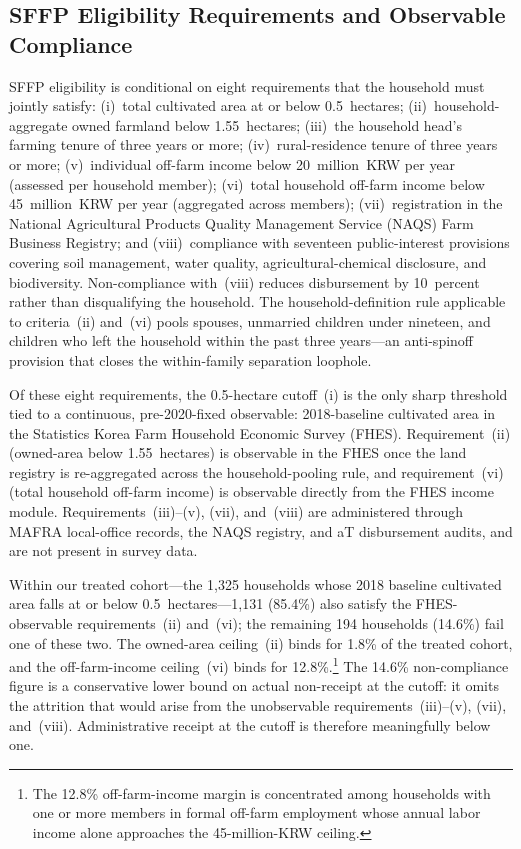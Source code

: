 \documentclass[12pt, a4paper]{article}
\begin{document}
\subsection{SFFP Eligibility Requirements and Observable Compliance}
\label{sec:institutional-eligibility}

SFFP eligibility is conditional on eight requirements that the household must jointly satisfy: (i)~total cultivated area at or below 0.5~hectares; (ii)~household-aggregate owned farmland below 1.55~hectares; (iii)~the household head's farming tenure of three years or more; (iv)~rural-residence tenure of three years or more; (v)~individual off-farm income below 20~million~KRW per year (assessed per household member); (vi)~total household off-farm income below 45~million~KRW per year (aggregated across members); (vii)~registration in the National Agricultural Products Quality Management Service (NAQS) Farm Business Registry; and (viii)~compliance with seventeen public-interest provisions covering soil management, water quality, agricultural-chemical disclosure, and biodiversity. Non-compliance with~(viii) reduces disbursement by 10~percent rather than disqualifying the household. The household-definition rule applicable to criteria~(ii) and~(vi) pools spouses, unmarried children under nineteen, and children who left the household within the past three years---an anti-spinoff provision that closes the within-family separation loophole.

Of these eight requirements, the 0.5-hectare cutoff~(i) is the only sharp threshold tied to a continuous, pre-2020-fixed observable: 2018-baseline cultivated area in the Statistics Korea Farm Household Economic Survey (FHES). Requirement~(ii) (owned-area below 1.55~hectares) is observable in the FHES once the land registry is re-aggregated across the household-pooling rule, and requirement~(vi) (total household off-farm income) is observable directly from the FHES income module. Requirements~(iii)--(v), (vii), and~(viii) are administered through MAFRA local-office records, the NAQS registry, and aT disbursement audits, and are not present in survey data.

Within our treated cohort---the 1{,}325 households whose 2018 baseline cultivated area falls at or below 0.5~hectares---1{,}131 (85.4\%) also satisfy the FHES-observable requirements~(ii) and~(vi); the remaining 194 households (14.6\%) fail one of these two. The owned-area ceiling~(ii) binds for 1.8\% of the treated cohort, and the off-farm-income ceiling~(vi) binds for 12.8\%.\footnote{The 12.8\% off-farm-income margin is concentrated among households with one or more members in formal off-farm employment whose annual labor income alone approaches the 45-million-KRW ceiling.} The 14.6\% non-compliance figure is a conservative lower bound on actual non-receipt at the cutoff: it omits the attrition that would arise from the unobservable requirements~(iii)--(v), (vii), and~(viii). Administrative receipt at the cutoff is therefore meaningfully below one.
\end{document}
